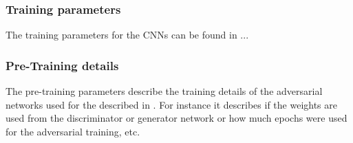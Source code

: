 
\subsubsection{Training parameters}
The training parameters for the CNNs can be found in ...




\subsubsection{Pre-Training details}

The pre-training parameters describe the training details of the adversarial networks used for the  described in .
For instance it describes if the weights are used from the discriminator or generator network or how much epochs were used for the adversarial training, etc.


%
%



